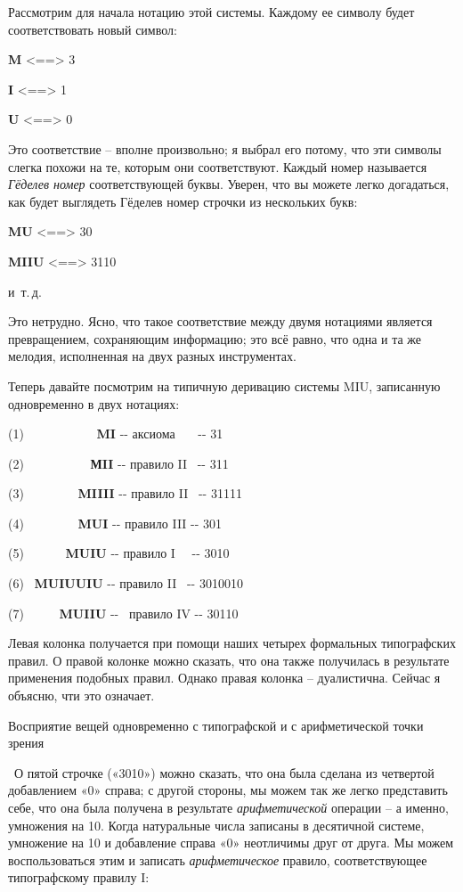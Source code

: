 \documentclass[../main.tex]{subfiles}
\begin{document}
Рассмотрим для начала нотацию этой системы. Каждому ее символу будет соответствовать новый символ:

\textbf{M} \textless==\textgreater{} 3

\textbf{I} \textless==\textgreater{} 1

\textbf{U} \textless==\textgreater{} 0

Это соответствие \--- вполне произвольно; я выбрал его потому, что эти символы слегка похожи на те, которым они соответствуют. Каждый номер называется \emph{Гёделев номер} соответствующей буквы. Уверен, что вы можете легко догадаться, как будет выглядеть Гёделев номер строчки из нескольких букв:

\textbf{MU} \textless==\textgreater{} 30

\textbf{MIIU} \textless==\textgreater{} 3110

и~т.\,д.

Это нетрудно. Ясно, что такое соответствие между двумя нотациями является превращением, сохраняющим информацию; это всё равно, что одна и та же мелодия, исполненная на двух разных инструментах.

Теперь давайте посмотрим на типичную деривацию системы MIU, записанную одновременно в двух нотациях:

(1)~~~~~~~~~~~ \textbf{MI} -\/- аксиома~~~ -\/- 31

(2)~~~~~~~~~~ \textbf{МII} -\/- правило II~ -\/- 311

(3)~~~~~~~~ \textbf{MIIII} -\/- правило II~ -\/- 31111

(4)~~~~~~~~ \textbf{MUI} -\/- правило III -\/- 301

(5)~~~~~~ \textbf{MUIU} -\/- правило I~~ -\/- 3010

(6)~ \textbf{MUIUUIU} -\/- правило II~ -\/- 3010010

(7)~~~~~ \textbf{MUIIU} -\/-~ правило IV -\/- 30110

Левая колонка получается при помощи наших четырех формальных типографских правил. О правой колонке можно сказать, что она также получилась в результате применения подобных правил. Однако правая колонка \--- дуалистична. Сейчас я объясню, чти это означает.

Восприятие вещей одновременно с типографской и с арифметической точки зрения

~О пятой строчке («3010») можно сказать, что она была сделана из четвертой добавлением «0» справа; с другой стороны, мы можем так же легко представить себе, что она была получена в результате \emph{арифметической} операции \--- а именно, умножения на 10. Когда натуральные числа записаны в десятичной системе, умножение на 10 и добавление справа «0» неотличимы друг от друга. Мы можем воспользоваться этим и записать \emph{арифметическое} правило, соответствующее типографскому правилу I:
\end{document}
